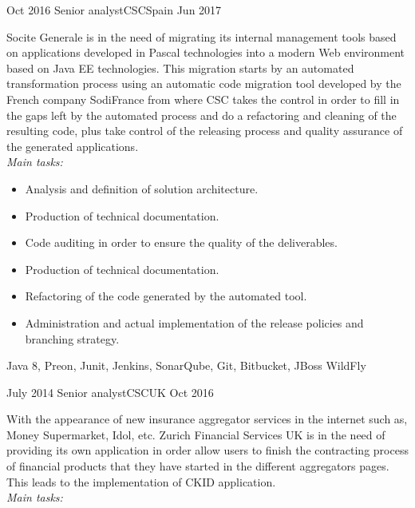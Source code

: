 %
%
%

\begin{experiences}
    \experience
    {Oct 2016} {Senior analyst}{CSC}{Spain}
    {Jun 2017}    {

Socite Generale is in the need of migrating its internal management tools based on applications
developed in Pascal technologies into a modern Web environment based on Java EE
technologies. This migration starts by an automated transformation process using an automatic
code migration tool developed by the French company SodiFrance from where CSC takes the
control in order to fill in the gaps left by the automated process and do a refactoring and
cleaning of the resulting code, plus take control of the releasing process and quality assurance of the generated applications.
\\
\emph{Main tasks:}
    	
                      \begin{itemize}
                        \item Analysis and definition of solution architecture.
                        \item Production of technical documentation.
                        \item Code auditing in order to ensure the quality of the deliverables.
                        \item Production of technical documentation.
                        \item Refactoring of the code generated by the automated tool.
                        \item Administration and actual implementation of the release policies and branching strategy.
                      \end{itemize}
                    }
                    {Java 8, Preon, Junit, Jenkins, SonarQube, Git, Bitbucket, JBoss
WildFly}
                    
  \emptySeparator
  
    \experience
    {July 2014} {Senior analyst}{CSC}{UK}
    {Oct 2016}    {

With the appearance of new insurance aggregator services in the internet such as, Money
Supermarket, Idol, etc. Zurich Financial Services UK is in the need of providing its own
application in order allow users to finish the contracting process of financial products that they
have started in the different aggregators pages. This leads to the implementation of CKID
application.
\\
\emph{Main tasks:}
    	
}
\end{experiences}

